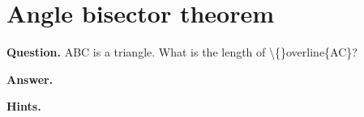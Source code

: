 \documentclass{article}
\begin{document}
\section*{Angle bisector theorem}
\textbf{Question.} ABC is a triangle. What is the length of \textbackslash\{\}overline\{AC\}?

\textbf{Answer.} 

\textbf{Hints.}
\begin{itemize}

\end{itemize}
\end{document}
